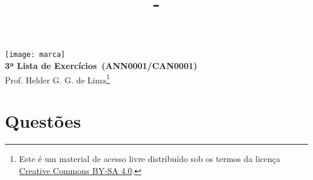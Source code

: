 \documentclass[12pt,a4paper]{article}
\author{\eu}
\title{\tipo - \disciplina}
\date{\data}
\newcommand{\IconPc}{\texttt{[image: computer.png]}}
\newcommand{\IconCalc}{\texttt{[image: calculator.png]}}
\newcommand{\IconThink}{\texttt{[image: pencil.png]}}
\newcommand{\IconCheck}{\texttt{[image: checkmark.png]}}
\newlength{\SmileysLength}
\newcommand{\calc}{\hspace*{-\SmileysLength}\makebox[0pt][r]{\IconCalc}%
   \hspace*{\SmileysLength}}
\newcommand{\software}{\hspace*{-\SmileysLength}\makebox[0pt][r]{\IconPc}%
   \hspace*{\SmileysLength}}
\newcommand{\teoria}{\hspace*{-\SmileysLength}\makebox[0pt][r]{\IconThink}%
   \hspace*{\SmileysLength}}
\newcommand{\conceito}{\hspace*{-\SmileysLength}\makebox[0pt][r]{\IconCheck}%
   \hspace*{\SmileysLength}}
\newcommand*\tipo{3ª Lista de Exercícios}
\newcommand*\disciplina{ANN0001/CAN0001}
\newcommand*\eu{Helder G. G. de Lima}
\begin{document}
\begin{center}
\texttt{[image: marca]} \\
\textbf{\tipo\ (\disciplina)} \\
Prof. \eu\footnote{
Este é um material de acesso livre distribuído sob os termos da licença \href{https://creativecommons.org/licenses/by-sa/4.0/deed.pt_BR}{Creative Commons BY-SA 4.0}.}
\end{center}


\section*{Questões}
\end{document}
